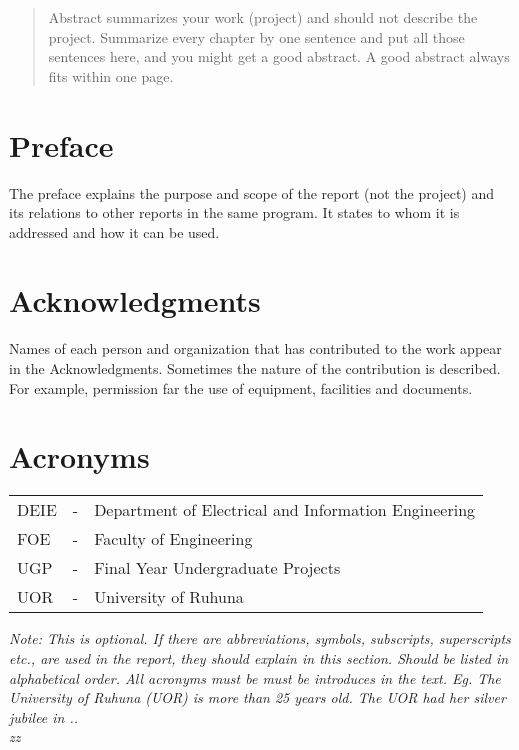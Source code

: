 \begin{abstract}
Abstract summarizes your work (project) and should not describe the project. Summarize every chapter by one sentence and put all those sentences here, and you might get a good abstract. A good abstract always fits within one page.
\end{abstract}

\chapter*{Preface}
The preface explains the purpose and scope of the report (not the project) and its relations to other reports in the same program. It states to whom it is addressed and how it can be used.

\chapter*{Acknowledgments}
Names of each person and organization that has contributed to the work appear in the Acknowledgments. Sometimes the nature of the contribution is described. For example, permission far the use of equipment, facilities and documents.

\tableofcontents

\chapter*{Acronyms}


\noindent \begin{tabular}{lcl}
DEIE	& - & Department of Electrical and Information Engineering\\
FOE	& - & Faculty of Engineering\\
UGP	& - & Final Year Undergraduate Projects \\
UOR	& - & University of Ruhuna
\end{tabular} 

\vspace{0.5in}

\textit{Note: This is optional. If there are abbreviations, symbols, subscripts, superscripts etc., are used in the report, they should explain in this section. Should be listed in alphabetical order. All acronyms must be must be introduces in the text. Eg. The University of Ruhuna (UOR) is more than 25 years old. The UOR had her silver jubilee in ..\\
zz}


\listoftables
\listoffigures

\newpage